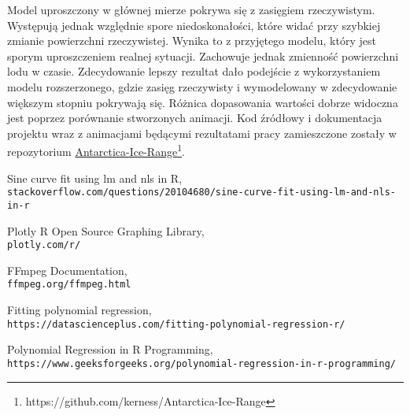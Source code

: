 \documentclass[letterpaper,12pt]{article}
\begin{document}
Model uproszczony w głównej mierze pokrywa się z zasięgiem rzeczywistym. Występują jednak względnie spore niedoskonałości, które widać przy szybkiej zmianie powierzchni rzeczywistej. Wynika to z przyjętego modelu, który jest sporym uproszczeniem realnej sytuacji. Zachowuje jednak zmienność powierzchni lodu w czasie. Zdecydowanie lepszy rezultat dało podejście z wykorzystaniem modelu rozszerzonego, gdzie zasięg rzeczywisty i wymodelowany w zdecydowanie większym stopniu pokrywają się. Różnica dopasowania wartości dobrze widoczna jest poprzez porównanie stworzonych animacji. Kod źródłowy i dokumentacja projektu wraz z animacjami będącymi rezultatami pracy zamieszczone zostały w repozytorium \href{https://github.com/kerness/Antarctica-Ice-Range}{Antarctica-Ice-Range\footnote{https://github.com/kerness/Antarctica-Ice-Range}}.



\renewcommand\refname{Bibliografia}
\begin{thebibliography}{99}


Sine curve fit using lm and nls in R,
\\\texttt{stackoverflow.com/questions/20104680/sine-curve-fit-using-lm-and-nls-in-r}

Plotly R Open Source Graphing Library,
\\\texttt{plotly.com/r/}

FFmpeg Documentation,
\\\texttt{ffmpeg.org/ffmpeg.html}

Fitting polynomial regression,
\\\texttt{https://datascienceplus.com/fitting-polynomial-regression-r/}

Polynomial Regression in R Programming,
\\\texttt{https://www.geeksforgeeks.org/polynomial-regression-in-r-programming/}



\end{thebibliography}
\end{document}
